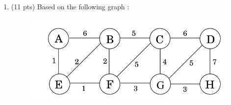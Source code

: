 \documentclass[12pt]{article}
\theoremstyle{remark}
\newtheorem*{solution}{Solution}
\begin{document}
\begin{enumerate}
\begin{enumerate}
\pagebreak
\item(5 pts) Prove the correctness of your algorithm.
\end{enumerate}
\begin{solution}
$\newline$ Loop Invariance for the added for loop: dist(v[0]), dist(v[1])...dist(v[i-1]) $\leq$ max for the already completed version of Dijkstra's algorithm. $\newline \newline$ Base case: dist(v[0]) is greater than 0, which max is then set equal to. max is then equal to the only vertex checked, which fits into the $\geq$ title. $\newline \newline$ Maintanence: For every iteration of the loop, max is set to the biggest value it comes across. Any value less than the current max can then be ignored, as it is not the max. Thus, as the largest value is contained in max, which means every value dist(v[0-(i-1)]) is necessarily less than or equal to max. $\newline \newline$ Termination: On the last iteration, the max either keeps the last value if it is the largest or ignores it because it is less than the current max. In either case, the largest value overall is now contained within the max variable. This means that every single distance value for every vertex is either less than or equal to max. $\newline \newline$ Since the shortest path has already been obtained before this invariance relation comes into play and it does obtain the maximum as shown in the invariance, then the max value is the maximum value needed within the shortest path.
\end{solution}

\pagebreak

\item (11 pts) Based on the following graph :
\begin{figure}[h!]
\begin{center}
\includegraphics[scale=0.3]{mst_graph_q2.jpg} 
\end{center}
\end{figure}


\end{enumerate}
\end{document}
